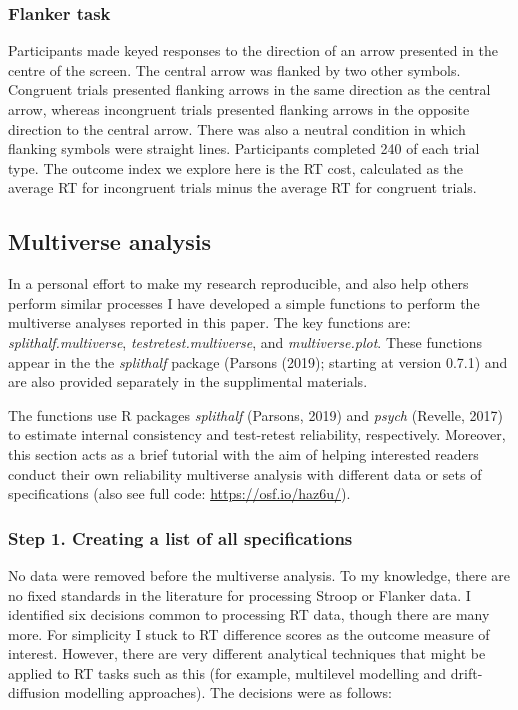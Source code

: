 \documentclass[english,man,floatsintext]{apa6}
\begin{document}
\hypertarget{flanker-task}{%
\subsubsection{Flanker task}\label{flanker-task}}

Participants made keyed responses to the direction of an arrow presented in the centre of the screen. The central arrow was flanked by two other symbols. Congruent trials presented flanking arrows in the same direction as the central arrow, whereas incongruent trials presented flanking arrows in the opposite direction to the central arrow. There was also a neutral condition in which flanking symbols were straight lines. Participants completed 240 of each trial type. The outcome index we explore here is the RT cost, calculated as the average RT for incongruent trials minus the average RT for congruent trials.

\hypertarget{multiverse-analysis}{%
\subsection{Multiverse analysis}\label{multiverse-analysis}}

In a personal effort to make my research reproducible, and also help others perform similar processes I have developed a simple functions to perform the multiverse analyses reported in this paper. The key functions are: \emph{splithalf.multiverse}, \emph{testretest.multiverse}, and \emph{multiverse.plot}. These functions appear in the the \emph{splithalf} package (Parsons (2019); starting at version 0.7.1) and are also provided separately in the supplimental materials.

The functions use R packages \emph{splithalf} (Parsons, 2019) and \emph{psych} (Revelle, 2017) to estimate internal consistency and test-retest reliability, respectively. Moreover, this section acts as a brief tutorial with the aim of helping interested readers conduct their own reliability multiverse analysis with different data or sets of specifications (also see full code: \url{https://osf.io/haz6u/}).

\hypertarget{step-1.-creating-a-list-of-all-specifications}{%
\subsubsection{Step 1. Creating a list of all specifications}\label{step-1.-creating-a-list-of-all-specifications}}

No data were removed before the multiverse analysis. To my knowledge, there are no fixed standards in the literature for processing Stroop or Flanker data. I identified six decisions common to processing RT data, though there are many more. For simplicity I stuck to RT difference scores as the outcome measure of interest. However, there are very different analytical techniques that might be applied to RT tasks such as this (for example, multilevel modelling and drift-diffusion modelling approaches). The decisions were as follows:
\end{document}
